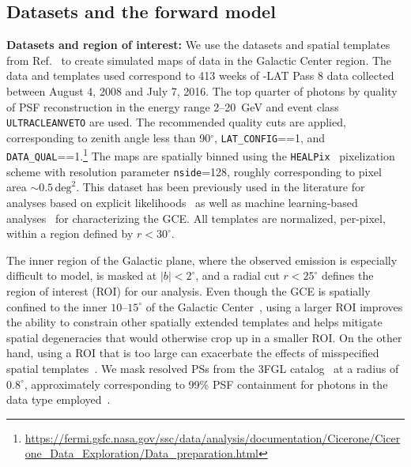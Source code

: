 \documentclass[prd,aps,10pt,nofootinbib,twocolumn,superscriptaddress,preprintnumbers,balancelastpage,longbibliography,floatfix]{revtex4-2}
\begin{document}
\subsection{Datasets and the forward model}
\label{sec:datasets}

\noindent
\textbf{Datasets and region of interest:} We use the datasets and spatial templates from Ref.~\cite{rodd_nicholas_safdi_siddharth_2016,Mishra-Sharma:2016gis} to create simulated maps of \Fermi data in the Galactic Center region. The data and templates used correspond to 413 weeks of \Fermi-LAT Pass 8 data collected between August 4, 2008 and July 7, 2016. The top quarter of photons by quality of PSF reconstruction in the energy range 2--20~GeV and event class \texttt{ULTRACLEANVETO} are used. The recommended quality cuts are applied, corresponding to zenith angle less than 90$^\circ$, \texttt{LAT\_CONFIG}==1, and \texttt{DATA\_QUAL}==1.\footnote{\url{https://fermi.gsfc.nasa.gov/ssc/data/analysis/documentation/Cicerone/Cicerone_Data_Exploration/Data_preparation.html}} The maps are spatially binned using the \texttt{HEALPix}~\cite{Gorski:2004by} pixelization scheme with resolution parameter \texttt{nside}=128, roughly corresponding to pixel area $\sim 0.5\,\mathrm{deg}^2$. This dataset has been previously used in the literature for analyses based on explicit likelihoods~\cite{Buschmann:2020adf,Chang:2019ars,Leane:2019xiy} as well as machine learning-based analyses~\cite{List:2020mzd} for characterizing the GCE. All templates are normalized, per-pixel, within a region defined by $r < 30^\circ$.

The inner region of the Galactic plane, where the observed emission is especially difficult to model, is masked at $|b| < 2^\circ$, and a radial cut $r < 25^\circ$ defines the region of interest (ROI) for our analysis. Even though the GCE is spatially confined to the inner $10\mbox{--}15^\circ$ of the Galactic Center~\cite{Daylan:2014rsa,Calore:2014xka}, using a larger ROI improves the ability to constrain other spatially extended templates and helps mitigate spatial degeneracies that would otherwise crop up in a smaller ROI. On the other hand, using a ROI that is too large can exacerbate the effects of misspecified spatial templates~\cite{Chang:2018bpt}. We mask resolved PSs from the 3FGL catalog~\cite{Fermi-LAT:2015bhf} at a radius of $0.8^\circ$, approximately corresponding to 99\% PSF containment for photons in the data type employed~\cite{Fermi-LAT:2015bhf}. \\
\end{document}
